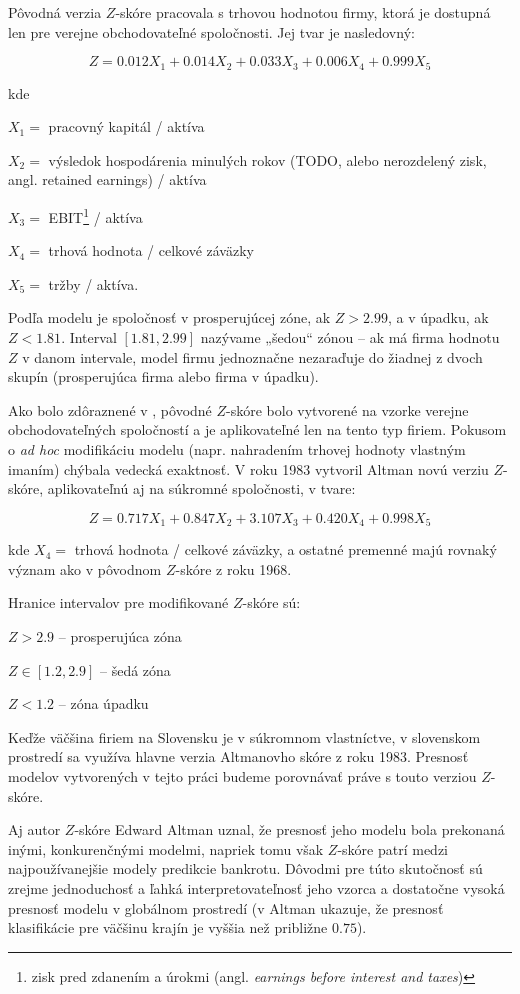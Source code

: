 Pôvodná verzia \(Z\)-skóre pracovala s trhovou hodnotou firmy, ktorá je dostupná len pre verejne obchodovateľné spoločnosti. Jej tvar je nasledovný:

\[
    Z = 0.012X_1 + 0.014X_2 + 0.033X_3 + 0.006X_4 + 0.999X_5
\]

kde

\(X_1 = \) pracovný kapitál / aktíva

\(X_2 = \) výsledok hospodárenia minulých rokov (TODO, alebo nerozdelený zisk, angl. retained earnings) / aktíva

\(X_3 = \) EBIT\footnote{zisk pred zdanením a úrokmi (angl. \emph{earnings before interest and taxes})} / aktíva

\(X_4 = \) trhová hodnota / celkové záväzky

\(X_5 = \) tržby / aktíva.

Podľa modelu je spoločnosť v prosperujúcej zóne, ak \(Z > 2.99\), a v úpadku, ak \(Z < 1.81\).
Interval \([1.81, 2.99]\) nazývame „šedou“ zónou – ak má firma hodnotu \(Z\) v danom intervale, model firmu jednoznačne nezaraďuje do žiadnej z dvoch skupín
(prosperujúca firma alebo firma v úpadku).

Ako bolo zdôraznené v \cite{altman1983}, pôvodné \(Z\)-skóre bolo vytvorené na vzorke verejne obchodovateľných spoločností a je aplikovateľné len na tento typ firiem.
Pokusom o \emph{ad hoc} modifikáciu modelu (napr. nahradením trhovej hodnoty vlastným imaním) chýbala vedecká exaktnosť.
V roku 1983 vytvoril Altman novú verziu \(Z\)-skóre, aplikovateľnú aj na súkromné spoločnosti, v tvare:

\[
    Z = 0.717X_1 + 0.847X_2 + 3.107X_3 + 0.420X_4 + 0.998X_5
\]

kde \(X_4 = \) trhová hodnota / celkové záväzky, a ostatné premenné majú rovnaký význam ako v pôvodnom \(Z\)-skóre z roku 1968.

Hranice intervalov pre modifikované \(Z\)-skóre sú:

\( Z > 2.9\) – prosperujúca zóna

\( Z \in [1.2, 2.9]\) – šedá zóna

\( Z < 1.2 \) – zóna úpadku

Keďže väčšina firiem na Slovensku je v súkromnom vlastníctve, v slovenskom prostredí sa využíva hlavne verzia Altmanovho skóre z roku 1983.
Presnosť modelov vytvorených v tejto práci budeme porovnávať práve s touto verziou \(Z\)-skóre.

Aj autor \(Z\)-skóre Edward Altman uznal, že presnosť jeho modelu bola prekonaná inými, konkurenčnými modelmi\cite{altman2017}, napriek tomu však \(Z\)-skóre patrí medzi najpoužívanejšie modely predikcie bankrotu.
Dôvodmi pre túto skutočnosť sú zrejme jednoduchosť a ľahká interpretovateľnosť jeho vzorca a dostatočne vysoká presnosť modelu v globálnom prostredí
(v \cite{altman2017} Altman ukazuje, že presnosť klasifikácie pre väčšinu krajín je vyššia než približne \(0.75\)).


